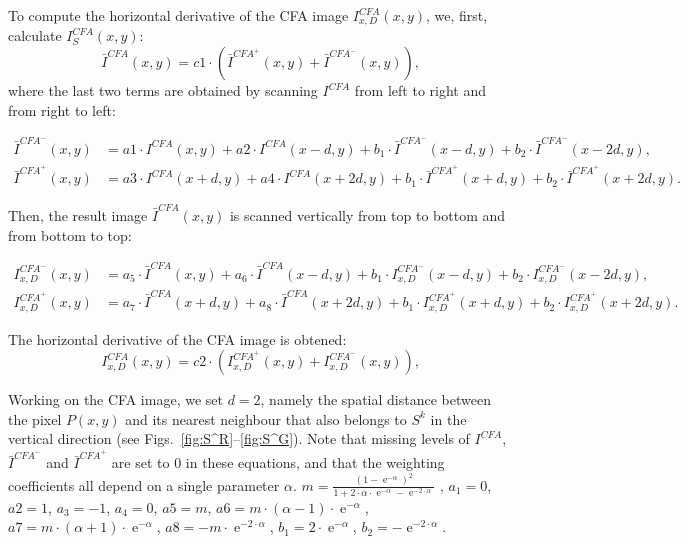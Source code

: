 \documentclass[twoside]{article}
\newcommand\Smo{\bar} %
\DeclareMathOperator{\e}{e}
\begin{document}
To compute the horizontal derivative of the CFA image $I^{CFA}_{x,D}(x,y)$, we, first, calculate $I^{CFA}_S(x,y)$: 
\begin{equation}
\Smo{I}^{CFA}(x,y) = c1 \cdot\left(\Smo{I}^{{CFA}^+}(x,y) + \Smo{I}^{{CFA}^-}(x,y)\right) \text{,}
\label{eq:smo_deriche}
\end{equation}
\noindent where the last two terms are obtained by scanning $I^{CFA}$ from left to right and from right to left:


\begin{align}
\Smo{I}^{{CFA}^-}(x,y)&= a1 \cdot I^{CFA}(x,y) + a2 \cdot I^{CFA}(x-d,y) + b_1 \cdot \Smo{I}^{{CFA}^-}(x-d,y) + b_2 \cdot  \Smo{I}^{{CFA}^-}(x-2d,y) 	\text{,} \label{eq:deriv_L2R} \\
\Smo{I}^{{CFA}^+}(x,y)&= a3 \cdot I^{CFA}(x+d,y) + a4 \cdot I^{CFA}(x+2d,y) + b_1 \cdot \Smo{I}^{{CFA}^+}(x+d,y) + b_2 \cdot \Smo{I}^{{CFA}^+}(x+2d,y) \text{.} \label{eq:deriv_R2L}
\end{align}


Then, the result image $\Smo{I}^{CFA}(x,y)$ is scanned vertically from top to bottom and from bottom to top:

\begin{align}
I^{{CFA}^-}_{x,D}(x,y)&=a_5 \cdot \Smo{I}^{CFA}(x,y) + a_6 \cdot \Smo{I}^{CFA}(x-d,y) + b_1 \cdot  I^{{CFA}^-}_{x,D}(x-d,y) + b_2 \cdot I^{{CFA}^-}_{x,D}(x-2d,y) 	\text{,} \label{eq:smooth_T2B} \\
I^{{CFA}^+}_{x,D}(x,y)&=a_7 \cdot \Smo{I}^{CFA}(x+d,y) + a_8 \cdot \Smo{I}^{CFA}(x+2d,y) + b_1 \cdot I^{{CFA}^+}_{x,D}(x+d,y) + b_2 \cdot I^{{CFA}^+}_{x,D}(x+2d,y) \text{.} \label{eq:smooth_B2T}
\end{align}
 
The horizontal derivative of the CFA image is obtened:
\begin{equation}
I^{CFA}_{x,D}(x,y) = c2 \cdot\left(I^{{CFA}^+}_{x,D}(x,y) + I^{{CFA}^-}_{x,D}(x,y)\right) \text{,}
\label{eq:deriv_deriche}
\end{equation}

\noindent Working on the CFA image, we set $d=2$, namely the spatial distance between the pixel $P(x,y)$ and its nearest neighbour that also belongs to $S^k$ in the vertical direction (see Figs.~\ref{fig:S^R}--\ref{fig:S^G}). Note that missing levels of $I^{CFA}$, $\Smo {I}^{{CFA}^-}$ and $\Smo {I}^{{CFA}^+}$ are set to $0$ in these equations, and that the weighting coefficients all depend on a single parameter $\alpha$.
 $m = \frac{(1-\e^{-\alpha})^2}{1+2 \cdot \alpha \cdot \e^{-\alpha}- \e ^{-2\cdot \alpha}}$
, $a_1 = 0$, $a2 = 1$, $a_3 = -1$, $a_4 =0$, $a5=m$, $a6=m \cdot (\alpha -1)\cdot \e ^{-\alpha}$, $a7= m \cdot (\alpha +1)\cdot \e ^{-\alpha}$, $a8=-m \cdot \e ^{-2 \cdot \alpha}$, $b_1 = 2\cdot \e ^{-\alpha}$, $b_2 = -\e ^{-2 \cdot \alpha}$. 
\end{document}
